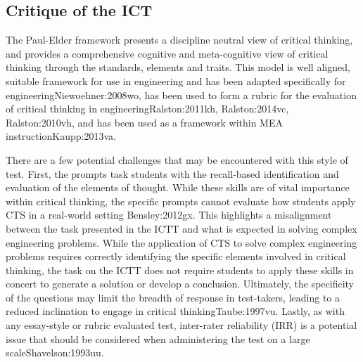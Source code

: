 \subsection{Critique of the ICT}


The Paul-Elder framework presents a discipline neutral view of critical thinking, and provides a comprehensive cognitive and meta-cognitive view of critical thinking through the standards, elements and traits\cite{Paul:2006kv}.  This model is well aligned, suitable framework for use in engineering and has been adapted specifically for engineering{Niewoehner:2008wo}, has been used to form a rubric for the evaluation of critical thinking in engineering{Ralston:2011kh, Ralston:2014vc, Ralston:2010vh}, and has been used as a framework within MEA instruction{Kaupp:2013va}. 

There are a few potential challenges that may be encountered with this style of test. First, the prompts task students with the recall-based identification and evaluation of the elements of thought. While these skills are of vital importance within critical thinking, the specific prompts cannot evaluate how students apply CTS in a real-world setting {Bensley:2012gx}.  This highlights a misalignment between the task presented in the ICTT and what is expected in solving complex engineering problems.  While the application of CTS to solve complex engineering problems requires correctly identifying the specific elements involved in critical thinking, the task on the ICTT does not require students to apply these skills in concert to generate a solution or develop a conclusion.  Ultimately, the specificity of the questions may limit the breadth of response in test-takers, leading to a reduced inclination to engage in critical thinking{Taube:1997vu}. Lastly, as with any essay-style or rubric evaluated test, inter-rater reliability (IRR) is a potential issue that should be considered when administering the test on a large scale{Shavelson:1993uu}. 
